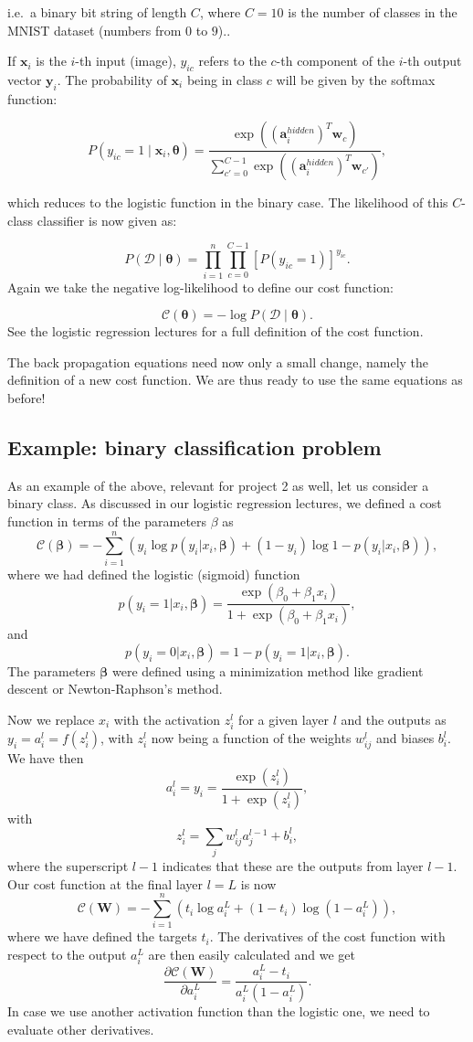 \documentclass[%
oneside,                 %
final,                   %
10pt]{article}
\begin{document}
i.e.~a binary bit string of length $C$, where $C = 10$ is the number of classes in the MNIST dataset (numbers from $0$ to $9$)..  

If $\bm{x}_i$ is the $i$-th input (image), $y_{ic}$ refers to the $c$-th component of the $i$-th
output vector $\bm{y}_i$.  
The probability of $\bm{x}_i$ being in class $c$ will be given by the softmax function:  

\[
P(y_{ic} = 1 \mid \bm{x}_i, \bm{\theta}) = \frac{\exp{((\bm{a}_i^{hidden})^T \bm{w}_c)}}
{\sum_{c'=0}^{C-1} \exp{((\bm{a}_i^{hidden})^T \bm{w}_{c'})}} ,
\]

which reduces to the logistic function in the binary case.  
The likelihood of this $C$-class classifier
is now given as:  

\[
P(\mathcal{D} \mid \bm{\theta}) = \prod_{i=1}^n \prod_{c=0}^{C-1} [P(y_{ic} = 1)]^{y_{ic}} .
\]
Again we take the negative log-likelihood to define our cost function:  

\[
\mathcal{C}(\bm{\theta}) = - \log{P(\mathcal{D} \mid \bm{\theta})}.
\]
See the logistic regression lectures for a full definition of the cost function.

The back propagation equations need now only a small change, namely the definition of a new cost function. We are thus ready to use the same equations as before!

\subsection{Example: binary classification problem}

As an example of the above, relevant for project 2 as well, let us consider a binary class. As discussed in our logistic regression lectures, we defined a cost function in terms of the parameters $\beta$ as
\[
\mathcal{C}(\bm{\beta}) = - \sum_{i=1}^n \left(y_i\log{p(y_i \vert x_i,\bm{\beta})}+(1-y_i)\log{1-p(y_i \vert x_i,\bm{\beta})}\right),
\]
where we had defined the logistic (sigmoid) function
\[
p(y_i =1\vert x_i,\bm{\beta})=\frac{\exp{(\beta_0+\beta_1 x_i)}}{1+\exp{(\beta_0+\beta_1 x_i)}},
\]
and
\[
p(y_i =0\vert x_i,\bm{\beta})=1-p(y_i =1\vert x_i,\bm{\beta}).
\]
The parameters $\bm{\beta}$ were defined using a minimization method like gradient descent or Newton-Raphson's method. 

Now we replace $x_i$ with the activation $z_i^l$ for a given layer $l$ and the outputs as $y_i=a_i^l=f(z_i^l)$, with $z_i^l$ now being a function of the weights $w_{ij}^l$ and biases $b_i^l$. 
We have then
\[
a_i^l = y_i = \frac{\exp{(z_i^l)}}{1+\exp{(z_i^l)}},
\]
with 
\[
z_i^l = \sum_{j}w_{ij}^l a_j^{l-1}+b_i^l,
\]
where the superscript $l-1$ indicates that these are the outputs from layer $l-1$.
Our cost function at the final layer $l=L$ is now
\[
\mathcal{C}(\bm{W}) = - \sum_{i=1}^n \left(t_i\log{a_i^L}+(1-t_i)\log{(1-a_i^L)}\right),
\]
where we have defined the targets $t_i$. The derivatives of the cost function with respect to the output $a_i^L$ are then easily calculated and we get
\[
\frac{\partial \mathcal{C}(\bm{W})}{\partial a_i^L} = \frac{a_i^L-t_i}{a_i^L(1-a_i^L)}. 
\]
In case we use another activation function than the logistic one, we need to evaluate other derivatives. 
\end{document}
